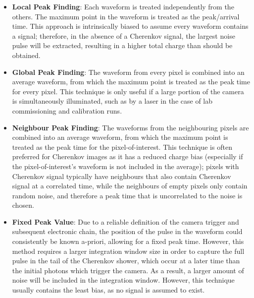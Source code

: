 \begin{itemize}
	\item \textbf{Local Peak Finding}: Each waveform is treated independently from the others. The maximum point in the waveform is treated as the peak/arrival time. This approach is intrinsically biased to assume every waveform contains a signal; therefore, in the absence of a Cherenkov signal, the largest noise pulse will be extracted, resulting in a higher total charge than should be obtained.
	\item \textbf{Global Peak Finding}: The waveform from every pixel is combined into an average waveform, from which the maximum point is treated as the peak time for every pixel. This technique is only useful if a large portion of the camera is simultaneously illuminated, such as by a laser in the case of lab commissioning and calibration runs.
	\item \textbf{Neighbour Peak Finding}: The waveforms from the neighbouring pixels are combined into an average waveform, from which the maximum point is treated as the peak time for the pixel-of-interest. This technique is often preferred for Cherenkov images as it has a reduced charge bias (especially if the pixel-of-interest's waveform is not included in the average); pixels with Cherenkov signal typically have neighbours that also contain Cherenkov signal at a correlated time, while the neighbours of empty pixels only contain random noise, and therefore a peak time that is uncorrelated to the noise is chosen.
	\item \textbf{Fixed Peak Value}: Due to a reliable definition of the camera trigger and subsequent electronic chain, the position of the pulse in the waveform could consistently be known a-priori, allowing for a fixed peak time. However, this method requires a larger integration window size in order to capture the full pulse in the tail of the Cherenkov shower, which occur at a later time than the initial photons which trigger the camera. As a result, a larger amount of noise will be included in the integration window. However, this technique usually contains the least bias, as no signal is assumed to exist.
\end{itemize}


